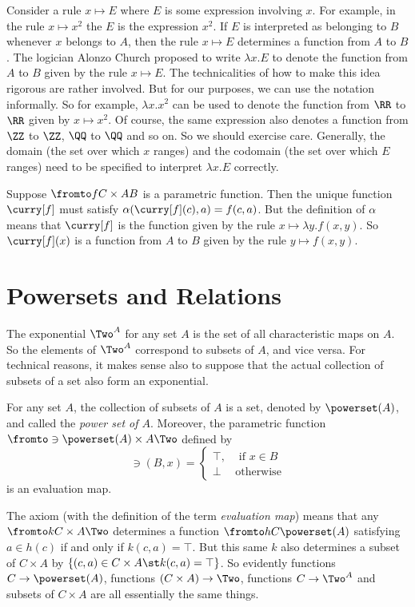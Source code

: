 Consider a rule $x\mapsto E$ where $E$ is some expression involving $x$. For example,
in the rule $x\mapsto x^2$ the $E$ is the expression $x^2$. If $E$ is interpreted as belonging
to $B$ whenever $x$ belongs to $A$, then the rule $x\mapsto E$ determines a function from $A$
to $B$. The logician Alonzo Church proposed to write $\lambda x.E$ to denote the function
from $A$ to $B$ given by the rule $x\mapsto E$. The technicalities of how to make this idea rigorous are rather involved. But for our purposes, we can use the notation informally. So for example, $\lambda x.x^2$
can be used to denote the function from $\RR$ to $\RR$ given by $x\mapsto x^2$. Of course, the
same expression also denotes a function from $\ZZ$ to $\ZZ$, $\QQ$ to $\QQ$ and so on. So we should
exercise care. Generally, the domain (the set over which $x$ ranges) and the codomain (the set over which 
$E$ ranges) need to be specified to interpret $\lambda x.E$ correctly.

Suppose $\fromto f{C\times A}B$ is a parametric function. 
Then the unique function $\curry[f]$ must satisfy $\alpha(\curry[f](c),a) = f(c,a)$. 
But the definition of $\alpha$ means that $\curry[f]$ is the function given by the rule 
$x\mapsto \lambda y.f(x,y)$. So $\curry[f](x)$ is a function from $A$ to $B$ given by the rule
$y\mapsto f(x,y)$.

\section{Powersets and Relations}

The exponential $\Two^A$ for any set $A$ is the set of all characteristic maps on $A$. So the elements of $\Two^A$ correspond
to subsets of $A$, and vice versa. For technical reasons, it makes sense also to suppose that the actual collection of subsets of a set also form an exponential.

\begin{axiom}
	For any set $A$, the collection of subsets of $A$ is a set, denoted by $\powerset(A)$, and called the \emph{power set of $A$}. Moreover, the parametric function $\fromto \ni{\powerset(A)\times A}\Two$ defined by 
	\[\ni(B,x) = \begin{cases}
		\top, &\text{ if } x\in B\\
		\bot &\text{otherwise}
	\end{cases}
	\]
	is an evaluation map. 
\end{axiom}

The axiom (with the definition of the term \emph{evaluation map}) means that any $\fromto k{C\times A}\Two$ determines a function $\fromto hC{\powerset(A)}$ satisfying $a\in h(c)$ if and only if $k(c,a)=\top$.
But this same $k$ also determines a subset of $C\times A$ by $\{(c,a)\in C\times A\st k(c,a)=\top\}$. So evidently functions $C\to\powerset(A)$, 
functions $(C\times A)\to \Two$, functions $C\to \Two^A$ and subsets of $C\times A$ are all essentially the same things.

